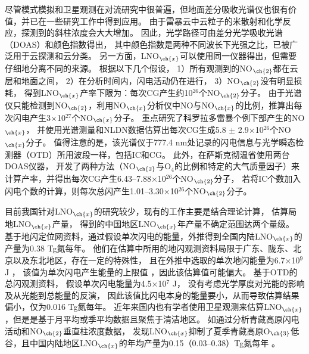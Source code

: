 尽管模式模拟和卫星观测在对流研究中很普遍，但地面差分吸收光谱仪也很有价值，并已在一些研究工作中得到应用。
由于雷暴云中云粒子的米散射和化学反应，探测到的斜柱浓度会大大增加\citep{Erle.1995,Pfeilsticker.1998,Winterrath.1999}。
因此，光学路径可由差分光学吸收光谱（DOAS）和颜色指数得出\citep{Veitel.1998,Wagner.1998}，
其中颜色指数是两种不同波长下光强之比，已被广泛用于云探测和云分类\citep{Wagner.2014,Wang.2015,Wagner.2016}。
另一方面，LNO$_{\ch{x}}$可以使用同一仪器得出，但需要仔细地分离不同的来源。
\citet{Noxon.1976}根据以下几个假设，
1）所有观测到的NO$_{\ch{2}}$都在云层和地面之间，
2）在分析时间内，闪电活动仍在进行，
3）NO$_{\ch{2}}$没有明显损耗，
得到LNO$_{\ch{x}}$产率下限为：每次CG产生约10$^{26}$个NO$_{\ch{2}}$分子。
由于光谱仪只能检测到NO$_{\ch{2}}$，\citet{Franzblau.1989}利用NO$_{\ch{x}}$分析仪中NO与NO$_{\ch{x}}$的比例，推算出每次闪电产生3$\times$10$^{27}$个NO$_{\ch{x}}$分子。
\citet{Langford.2004}重点研究了科罗拉多雷暴个例下部产生的NO$_{\ch{x}}$，
并使用光谱测量和NLDN数据估算出每次CG生成5.8 $\pm$ 2.9$\times$10$^{26}$个NO$_{\ch{x}}$分子。
值得注意的是，该光谱仪于777.4 nm处记录的闪电信息与光学瞬态检测器（OTD）所用波段一样，包括IC和CG。
此外，\citet{Fraser.2007}在萨斯克彻温省使用两台DOAS仪器，
开发了两种方法（NO$_{\ch{2}}$与O$_4$的比例和特定的大气质量因子）来计算产率，并得出每次CG产生6.43--7.88$\times$10$^{26}$个NO$_{\ch{2}}$分子，
若将IC个数加入闪电个数的计算，则每次总闪产生1.01--3.30$\times$10$^{26}$个NO$_{\ch{2}}$分子。

目前我国针对LNO$_{\ch{x}}$的研究较少，现有的工作主要是结合理论计算，
估算局地LNO$_{\ch{x}}$产量\citep{DuJian.2002,ZhangYiJun.2002,ZhouYunJun.2002}，
得到的中国地区LNO$_{\ch{x}}$年产量不确定范围达两个量级。
\citet{ZhouYunJun.2004}基于地闪定位网资料，通过假设单次闪电的能量，外推得到全国内陆LNO$_{\ch{x}}$的产量为0.38 Tg氮每年。
他们在估算中所用的地闪观测资料局限于广东、陇东、北京以及东北地区，存在一定的特殊性，
且在外推中选取的单次地闪能量为6.7$\times$10$^9$ J \citep{Price.1997a,Price.1997b}，
该值为单次闪电产生能量的上限值 \citep{Wang.1998}，因此该估算值可能偏大。
\citet{SunAnPing.2004}基于OTD的总闪观测资料，
假设单次闪电能量为4.5$\times$10$^7$ J，
没有考虑光学厚度对光能的影响及从光能到总能量的反演，
因此该值比闪电本身的能量要小，从而导致估算结果偏小，仅为0.016 Tg氮每年。
近年来国内也有学者使用卫星观测来估算LNO$_{\ch{x}}$，但是是基于月平均或季平均数据且聚焦于清洁地区。
如通过分析青藏高原闪电活动和NO$_{\ch{2}}$垂直柱浓度数据，
发现LNO$_{\ch{x}}$抑制了夏季青藏高原O$_{\ch{3}}$低谷，且中国内陆地区LNO$_{\ch{x}}$的年均产量为0.15（0.03--0.38）Tg氮每年 \citep{JuXiaoYu.2015,Guo.2017,GuoFengXia.2019,Li.2022}。

